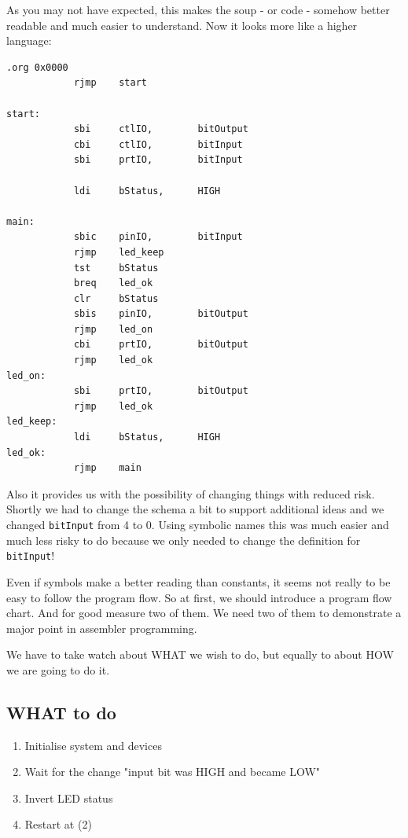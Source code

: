 As you may not have expected, this makes the soup - or code - somehow better readable and much easier to understand. Now it looks more like a higher language:

\begin{lstlisting}
.org 0x0000
            rjmp    start

start:
            sbi     ctlIO,        bitOutput
            cbi     ctlIO,        bitInput
            sbi     prtIO,        bitInput

            ldi     bStatus,      HIGH

main:
            sbic    pinIO,        bitInput
            rjmp    led_keep
            tst     bStatus
            breq    led_ok
            clr     bStatus
            sbis    pinIO,        bitOutput
            rjmp    led_on
            cbi     prtIO,        bitOutput
            rjmp    led_ok
led_on:
            sbi     prtIO,        bitOutput
            rjmp    led_ok
led_keep:
            ldi     bStatus,      HIGH
led_ok:
            rjmp    main
\end{lstlisting}

Also it provides us with the possibility of changing things with reduced risk. Shortly we had to change the schema a bit to support additional ideas and we changed \texttt{bitInput} from 4 to 0. Using symbolic names this was much easier and much less risky to do because we only needed to change the definition for \texttt{bitInput}!

Even if symbols make a better reading than constants, it seems not really to be easy to follow the program flow. So at first, we should introduce a program flow chart. And for good measure two of them. We need two of them to demonstrate a major point in assembler programming.

We have to take watch about WHAT we wish to do, but equally to about HOW we are going to do it.

\subsection{WHAT to do}

\begin{enumerate}
  \item Initialise system and devices
  \item Wait for the change "input bit was HIGH and became LOW"
  \item Invert LED status
  \item Restart at (2)
\end{enumerate}


